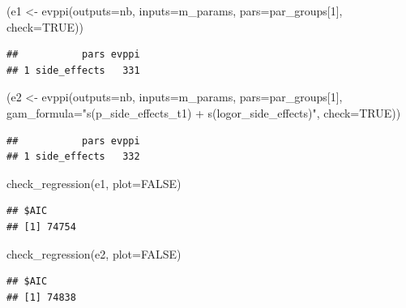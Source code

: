 \documentclass[
]{article}
\newenvironment{Shaded}{\begin{snugshade}}{\end{snugshade}}
\newcommand{\AttributeTok}[1]{\textcolor[rgb]{0.77,0.63,0.00}{#1}}
\newcommand{\ConstantTok}[1]{\textcolor[rgb]{0.00,0.00,0.00}{#1}}
\newcommand{\DecValTok}[1]{\textcolor[rgb]{0.00,0.00,0.81}{#1}}
\newcommand{\FunctionTok}[1]{\textcolor[rgb]{0.00,0.00,0.00}{#1}}
\newcommand{\NormalTok}[1]{#1}
\newcommand{\OtherTok}[1]{\textcolor[rgb]{0.56,0.35,0.01}{#1}}
\newcommand{\StringTok}[1]{\textcolor[rgb]{0.31,0.60,0.02}{#1}}
\begin{document}
\begin{Shaded}
\begin{Highlighting}[]
\NormalTok{(e1 }\OtherTok{\textless{}{-}} \FunctionTok{evppi}\NormalTok{(}\AttributeTok{outputs=}\NormalTok{nb, }\AttributeTok{inputs=}\NormalTok{m\_params, }\AttributeTok{pars=}\NormalTok{par\_groups[}\DecValTok{1}\NormalTok{], }\AttributeTok{check=}\ConstantTok{TRUE}\NormalTok{))}
\end{Highlighting}
\end{Shaded}

\begin{verbatim}
##           pars evppi
## 1 side_effects   331
\end{verbatim}

\begin{Shaded}
\begin{Highlighting}[]
\NormalTok{(e2 }\OtherTok{\textless{}{-}} \FunctionTok{evppi}\NormalTok{(}\AttributeTok{outputs=}\NormalTok{nb, }\AttributeTok{inputs=}\NormalTok{m\_params, }\AttributeTok{pars=}\NormalTok{par\_groups[}\DecValTok{1}\NormalTok{], }
             \AttributeTok{gam\_formula=}\StringTok{"s(p\_side\_effects\_t1) + s(logor\_side\_effects)"}\NormalTok{, }\AttributeTok{check=}\ConstantTok{TRUE}\NormalTok{))}
\end{Highlighting}
\end{Shaded}

\begin{verbatim}
##           pars evppi
## 1 side_effects   332
\end{verbatim}

\begin{Shaded}
\begin{Highlighting}[]
\FunctionTok{check\_regression}\NormalTok{(e1, }\AttributeTok{plot=}\ConstantTok{FALSE}\NormalTok{)}
\end{Highlighting}
\end{Shaded}

\begin{verbatim}
## $AIC
## [1] 74754
\end{verbatim}

\begin{Shaded}
\begin{Highlighting}[]
\FunctionTok{check\_regression}\NormalTok{(e2, }\AttributeTok{plot=}\ConstantTok{FALSE}\NormalTok{)}
\end{Highlighting}
\end{Shaded}

\begin{verbatim}
## $AIC
## [1] 74838
\end{verbatim}
\end{document}
